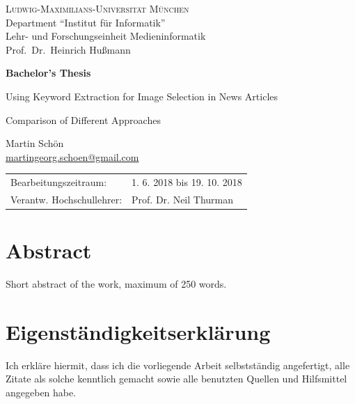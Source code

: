 \documentclass[11pt,a4paper,twoside]{article}
\begin{document}
\pagestyle{empty} %

\begin{center}
\textsc{Ludwig-Maximilians-Universität München}\\
Department ``Institut für Informatik''\\
Lehr- und Forschungseinheit Medieninformatik\\
Prof.\ Dr.\ Heinrich Hußmann

\vspace{5cm}
{\large\textbf{Bachelor's Thesis}}\vspace{.5cm}

{\LARGE Using Keyword Extraction for Image Selection in News Articles}\vspace{.3cm}

{\Large Comparison of Different Approaches}\vspace{1cm}

{\large Martin Schön}\\\href{mailto:martingeorg.schoen@gmail.com}{martingeorg.schoen@gmail.com}

\end{center}
\vfill

\begin{tabular}{ll}
Bearbeitungszeitraum: & 1. 6. 2018 bis 19. 10. 2018\\
Verantw. Hochschullehrer: & Prof. Dr. Neil Thurman
\end{tabular}

\clearpage
{}
\section*{Abstract}

Short abstract of the work, maximum of 250 words.

\clearpage

\section*{Eigenständigkeitserklärung}


\noindent Ich erkläre hiermit, dass ich die vorliegende Arbeit
selbstständig angefertigt, alle Zitate als solche kenntlich gemacht
sowie alle benutzten Quellen und Hilfsmittel angegeben habe.
\end{document}
